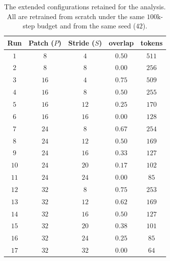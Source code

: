 \begin{table}[!b]
    \centering
    \small
    \begin{tabular}{@{}ccccc@{}}
        \toprule
        \textbf{Run} & \textbf{Patch ($P$)} & \textbf{Stride ($S$)} & \textbf{overlap} & \textbf{tokens} \\
        \midrule
        $1$ & $8$ & $4$ & $0.50$ & $511$ \\
        $2$ & $8$ & $8$ & $0.00$ & $256$ \\
        \midrule
        $3$ & $16$ & $4$ & $0.75$ & $509$ \\
        $4$ & $16$ & $8$ & $0.50$ & $255$ \\
        $5$ & $16$ & $12$ & $0.25$ & $170$ \\
        $6$ & $16$ & $16$ & $0.00$ & $128$ \\
        \midrule
        $7$ & $24$ & $8$ & $0.67$ & $254$ \\
        $8$ & $24$ & $12$ & $0.50$ & $169$ \\
        $9$ & $24$ & $16$ & $0.33$ & $127$ \\
        $10$ & $24$ & $20$ & $0.17$ & $102$ \\
        $11$ & $24$ & $24$ & $0.00$ & $85$ \\
        \midrule
        $12$ & $32$ & $8$ & $0.75$ & $253$ \\
        $13$ & $32$ & $12$ & $0.62$ & $169$ \\
        $14$ & $32$ & $16$ & $0.50$ & $127$ \\
        $15$ & $32$ & $20$ & $0.38$ & $101$ \\
        $16$ & $32$ & $24$ & $0.25$ & $85$ \\
        $17$ & $32$ & $32$ & $0.00$ & $64$ \\
        \bottomrule
    \end{tabular}
    \caption{The extended configurations retained for the analysis. All are retrained from scratch under the same $100$k-step budget and from the same seed ($42$).}
    \label{tab:hfModels}
\end{table}
